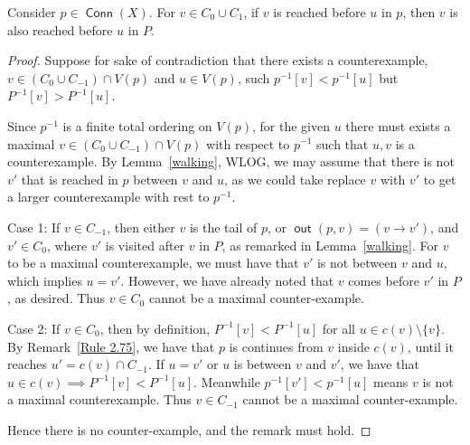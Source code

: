 \documentclass{article}
\DeclareMathOperator{\out}{\bm{\mathsf{out}}}
\DeclareMathOperator{\Conn}{\bm{\mathsf{Conn}}}
\newcommand{\hide}[1]{}
\newcommand{\dc}[1]{}%
\begin{document}
\begin{rmk} \label{ordering rule}Consider $p \in \Conn(X)$. For $v \in C_0\cup C_1$, if $v$ is reached before $u$ in $p$, then $v$ is also reached before $u$ in $P$.

\begin{proof}
Suppose for sake of contradiction that there exists a counterexample, $v \in (C_0 \cup C_{-1})\cap V(p)$ and $u \in V(p)$, such $p^{-1}[v]<p^{-1}[u]$ but $P^{-1}[v]>P^{-1}[u]$. 

Since $p^{-1}$ is a finite total ordering on $V(p)$, for the given $u$ there must exists a maximal $v \in (C_0 \cup C_{-1})\cap V(p)$ with respect to $p^{-1}$ such that $u,v$ is a counterexample. By Lemma~\ref{walking}, WLOG, we may assume that there is not $v'$ that is reached in $p$ between $v$ and $u$, as we could take replace $v$ with $v'$ to get a larger counterexample with rest to $p^{-1}$. 

 Case 1: If $v \in C_{-1}$, then either $v$ is the tail of $p$, or $\out(p,v) = (v \to v')$, and $v' \in C_0$, where $v'$ is visited after $v$ in $P$, as remarked in Lemma~\ref{walking}. For $v$ to be a maximal counterexample, we must have that $v'$ is not between $v$ and $u$, which implies $u = v'$. However, we have already noted that $v$ comes before $v'$ in $P$, as desired. Thus $v \in C_0$ cannot be a maximal counter-example.
 
 
Case 2: If $v \in C_0$, then by definition, $P^{-1}[v] < P^{-1}[u]$ for all $u \in c(v) \setminus \{v\}$. By Remark~\ref{Rule 2.75}, we have that $p$ is continues from $v$ inside $c(v)$, until it reaches $u' = c(v) \cap C_{-1}$.  If $u = v'$ or $u$ is between $v$ and $v'$, we have that $u \in c(v) \implies P^{-1}[v] <P^{-1}[u] $.  Meanwhile $p^{-1}[v']< p^{-1}[u]$ means $v$ is not a maximal counterexample. Thus $v \in C_{-1}$ cannot be a maximal counter-example.

Hence there is no counter-example, and the remark must hold.

\end{proof}

\hide{(this is a consequence of $v$ being the first reached in $c(v)$, first establishing this for the 1-cycle, and then by transitivity, as if we continue to visit another 1-cycle, we reach it with an edge $e \in E(P)$ from $u \in c(v) \cap C_{-1}$ to $v' \in C_0$, and $v$ comes before $u$ which comes before $v'$)} 

\end{rmk}


\dc{it is now clear to me from the proof technique of 5.1, but it absolutely does not follow from the lemma statement alone. I think it would be appropriate to make this a lemma or corollary since it is saying a lot, and give it a proper proof (which can heavily reference the definitions and techniques used in the proof of 5.1)}
\end{document}
